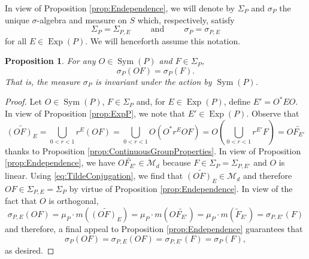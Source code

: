 \documentclass[11pt, letter]{book}
\newtheorem{proposition}[theorem]{Proposition}
\newcommand\Sym{\operatorname{Sym}}
\newcommand\Exp{\operatorname{Exp}}
\begin{document}
\noindent In view of Proposition \ref{prop:Endependence}, we will denote by $\Sigma_P$ and $\sigma_P$ the unique $\sigma$-algebra and measure on $S$ which, respectively, satisfy
\begin{equation*}
    \Sigma_P=\Sigma_{P,E}\hspace{1cm}\mbox{and}\hspace{1cm}\sigma_P=\sigma_{P,E}
\end{equation*}
for all $E\in\Exp(P)$. We will henceforth assume this notation. 


\begin{framed}
\begin{proposition}\label{prop:SymInvariance}
For any $O\in\Sym(P)$ and $F\in\Sigma_P$,
\begin{equation*}
\sigma_P(O F)=\sigma_P(F).
\end{equation*} 
That is, the measure $\sigma_P$ is invariant under the action by $\Sym(P)$.
\end{proposition}
\end{framed}


\begin{proof}
Let $O\in\Sym(P)$, $F\in\Sigma_P$ and, for $E\in \Exp(P)$, define $E'=O^* EO$. In view of Proposition \ref{prop:ExpP}, we note that $E'\in \Exp(P)$. Observe that
\begin{equation}\label{eq:TildeConjugation}
    \widetilde{(OF)_E}=\bigcup_{0<r<1}r^E (OF)=\bigcup_{0<r<1}O\left(O^* r^E O F\right)=O\left(\bigcup_{0<r<1} r^{E'}F\right)=O \widetilde{F_{E'}}
\end{equation}
thanks to Proposition \ref{prop:ContinuousGroupProperties}.
In view of Proposition \ref{prop:Endependence}, we have $O\widetilde{F_{E'}}\in \mathcal{M}_d$ because $F\in \Sigma_P=\Sigma_{P,E'}$ and $O$ is linear. Using \eqref{eq:TildeConjugation}, we find that $\widetilde{(OF)_E}\in\mathcal{M}_d$ and therefore  $OF\in\Sigma_{P,E}=\Sigma_P$ by virtue of Proposition \ref{prop:Endependence}. In view of the fact that $O$ is orthogonal,
\begin{equation*}
\sigma_{P,E}(OF)=\mu_P\cdot m\left(\widetilde{(OF)_E}\right)=\mu_P\cdot m\left(O \widetilde{F_{E'}}\right)=\mu_P\cdot m\left(\widetilde{F}_{E'}\right)=\sigma_{P,E'}(F)
\end{equation*}
and therefore, a final appeal to Proposition \ref{prop:Endependence} guarantees that
\begin{equation*}
    \sigma_P(OF)=\sigma_{P,E}(OF)=\sigma_{P,E'}(F)=\sigma_P(F),
\end{equation*}
as desired.
\end{proof}
\end{document}
